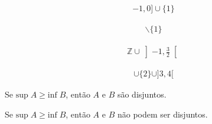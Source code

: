 

\begin{align*}
	[0, 1[
\end{align*}

\exercicio{6}

\begin{align*}
	]-1,0] \cup \{1\}
\end{align*}


\begin{align*}
	[-2,2]\backslash\{1\}
\end{align*}


\begin{align*}
	\mathbb{Z} \cup \left]-1, \frac{3}{2}\right[
\end{align*}


\begin{align*}
	[0,1]\cup\{2\}\cup]3,4[
\end{align*}


\begin{proposition}
	Se $\text{sup} \; A \geq \text{inf}\;B$, então $A$ e $B$ são disjuntos.
\end{proposition}

\begin{proposition}
	Se $\text{sup} \; A \geq \text{inf}\;B$, então $A$ e $B$ não podem ser
	disjuntos.
\end{proposition}
